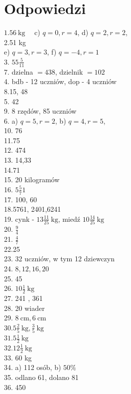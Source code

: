 \documentclass[10pt]{article}
\begin{document}
\section*{Odpowiedzi}
\(1.56 \mathrm{~kg} \quad\) c) \(q=0, r=4\), d) \(q=2, r=2\),\\
2.51 kg\\
e) \(q=3, r=3\), f) \(q=-4, r=1\)\\
3. \(55 \frac{5}{11}\)\\
7. dzielna \(=438\), dzielnik \(=102\)\\
4. bdb - 12 uczniów, dop - 4 uczniów\\
8.15, 48\\
5. 42\\
9. 8 rzędów, 85 uczniów\\
6. a) \(q=5, r=2\), b) \(q=4, r=5\),\\
10. 76\\
11.75\\
12. 474\\
13. 14,33\\
14.71\\
15. 20 kilogramów\\
16. \(5 \frac{5}{7} 1\)\\
17. 100, 60\\
18.5761, 2401,6241\\
19. cynk - \(13 \frac{11}{25} \mathrm{~kg}\), miedź \(10 \frac{14}{25} \mathrm{~kg}\)\\
20. \(\frac{9}{4}\)\\
21. \(\frac{4}{7}\)\\
22.25\\
23. 32 uczniów, w tym 12 dziewczyn\\
24. \(8,12,16,20\)\\
25. 45\\
26. \(10 \frac{1}{2} \mathrm{~kg}\)\\
27. 241 , 361\\
28. 20 wiader\\
29. \(8 \mathrm{~cm}, 6 \mathrm{~cm}\)\\
\(30.5 \frac{2}{5} \mathrm{~kg}, \frac{3}{5} \mathrm{~kg}\)\\
\(31.5 \frac{1}{2} \mathrm{~kg}\)\\
\(32.12 \frac{1}{2} \mathrm{~kg}\)\\
33. 60 kg\\
34. a) 112 osób, b) \(50 \%\)\\
35. odlano 61, dolano 81\\
36. 450\\
\end{document}
